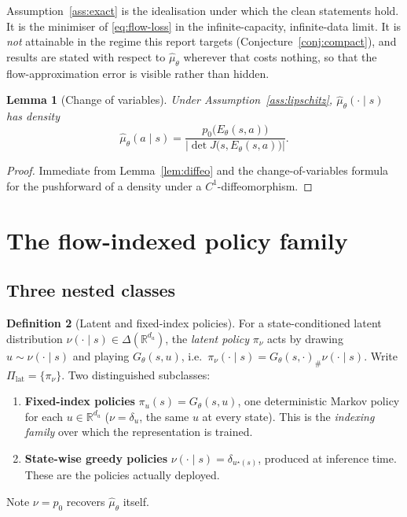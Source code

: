 \documentclass[11pt]{article}
\theoremstyle{plain}
\newtheorem{lemma}{Lemma}[section]
\theoremstyle{definition}
\newtheorem{definition}[lemma]{Definition}
\theoremstyle{remark}
\newcommand{\R}{\mathbb R}
\newcommand{\1}{\mathbf 1}
\newcommand{\Gth}{G_\theta}
\newcommand{\Eth}{E_\theta}
\newcommand{\muhat}{\hat\mu_\theta}
\newcommand{\Dset}{\Delta}
\newcommand{\Piclat}{\Pi_{\mathrm{lat}}}
\begin{document}
\noindent
Assumption~\ref{ass:exact} is the idealisation under which the clean statements hold. It
is the minimiser of \eqref{eq:flow-loss} in the infinite-capacity, infinite-data limit. It
is \emph{not} attainable in the regime this report targets (Conjecture~\ref{conj:compact}),
and results are stated with respect to $\muhat$ wherever that costs nothing, so that the
flow-approximation error is visible rather than hidden.

\begin{lemma}[Change of variables]
\label{lem:cov}
Under Assumption~\ref{ass:lipschitz}, $\muhat(\cdot\mid s)$ has density
\begin{equation}
\label{eq:cov}
  \muhat(a\mid s)=\frac{p_0\big(\Eth(s,a)\big)}{\big|\det J\big(s,\Eth(s,a)\big)\big|} .
\end{equation}
\end{lemma}

\begin{proof}
Immediate from Lemma~\ref{lem:diffeo} and the change-of-variables formula for the
pushforward of a density under a $C^1$-diffeomorphism.
\end{proof}

\section{The flow-indexed policy family}
\label{sec:family}

\subsection{Three nested classes}

\begin{definition}[Latent and fixed-index policies]
\label{def:classes}
For a state-conditioned latent distribution $\nu(\cdot\mid s)\in\Dset(\R^{d_a})$, the
\emph{latent policy} $\pi_\nu$ acts by drawing $u\sim\nu(\cdot\mid s)$ and playing
$\Gth(s,u)$, i.e.\ $\pi_\nu(\cdot\mid s)=\Gth(s,\cdot)_\#\nu(\cdot\mid s)$. Write
$\Piclat=\{\pi_\nu\}$. Two distinguished subclasses:
\begin{enumerate}
\item[(a)] \textbf{Fixed-index policies} $\pi_u(s)=\Gth(s,u)$, one deterministic Markov
  policy for each $u\in\R^{d_a}$ ($\nu=\delta_u$, the same $u$ at every state). This is the
  \emph{indexing family} over which the representation is trained.
\item[(b)] \textbf{State-wise greedy policies} $\nu(\cdot\mid s)=\delta_{u^\star(s)}$,
  produced at inference time. These are the policies actually deployed.
\end{enumerate}
Note $\nu=p_0$ recovers $\muhat$ itself.
\end{definition}
\end{document}
